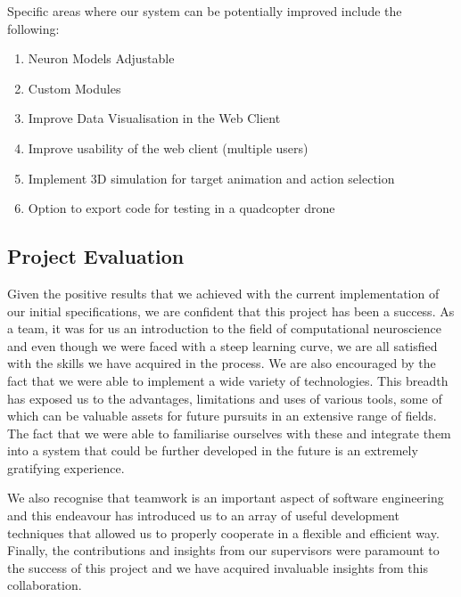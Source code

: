 \documentclass[a4paper,11pt]{article}
\begin{document}
Specific areas where our system can be potentially improved include the following:

\begin{enumerate}
\item Neuron Models Adjustable
\item Custom Modules
\item Improve Data Visualisation in the Web Client
\item Improve usability of the web client (multiple users)
\item Implement 3D simulation for target animation and action selection
\item Option to export code for testing in a quadcopter drone
\end{enumerate}

\subsection{Project Evaluation}

Given the positive results that we achieved with the current implementation of our initial specifications,
we are confident that this project has been a success. As a team, it was for us an introduction to the field of
computational neuroscience and even though we were faced with a steep learning curve, we are all satisfied
with the skills we have acquired in the process. We are also encouraged by the fact that we were able to implement
a wide variety of technologies. This breadth has exposed us to the advantages, limitations and uses of various tools,
some of which can be valuable assets for future pursuits in an extensive range of fields. The fact that we were able
to familiarise ourselves with these and integrate them into a system that could be further developed in the
future is an extremely gratifying experience.

We also recognise that teamwork is an important aspect of software engineering and this endeavour has
introduced us to an array of useful development techniques that allowed us to properly cooperate in a flexible
and efficient way. Finally, the contributions and insights from our supervisors were paramount to the success of
this project and we have acquired invaluable insights from this collaboration.







\clearpage

{}

\clearpage
\appendix
\end{document}
